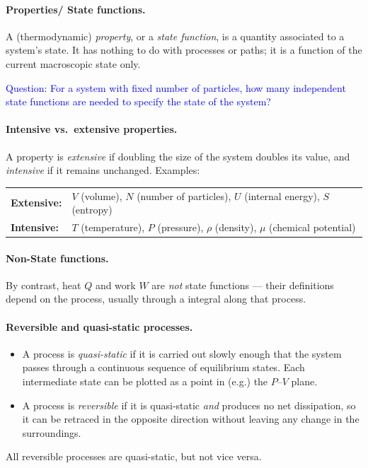 \paragraph{Properties/ State functions.}
A (thermodynamic) \emph{property}, or a \emph{state function}, is a quantity associated to a system's state. It 
has nothing to do with processes or paths; it is a function of the current macroscopic state only.

\textcolor{blue}{Question: For a system with fixed number of particles, how many independent state functions are needed to specify the state of the system?}

\paragraph{Intensive vs.\ extensive properties.}
A property is \emph{extensive} if doubling the size of the system doubles its value, and \emph{intensive} if it remains unchanged. Examples:
\begin{center}
\begin{tabular}{ll}
    \textbf{Extensive:} & $V$ (volume), $N$ (number of particles), $U$ (internal energy), $S$ (entropy)\\
    \textbf{Intensive:} & $T$ (temperature), $P$ (pressure), $\rho$ (density), $\mu$ (chemical potential)
\end{tabular}
\end{center}

\paragraph{Non-State functions.}
By contrast, heat $Q$ and work $W$ are \emph{not} state functions --- their definitions 
depend on the process, usually through a integral along that process. 

\paragraph{Reversible and quasi-static processes.}
\begin{itemize}
    \item A process is \emph{quasi-static} if it is carried out slowly enough that the system passes through a continuous sequence of equilibrium states. Each intermediate state can be plotted as a point in (e.g.) the $P$--$V$ plane.
    \item A process is \emph{reversible} if it is quasi-static \emph{and} produces no net dissipation, so it can be retraced in the opposite direction without leaving any change in the surroundings.
\end{itemize}
All reversible processes are quasi-static, but not vice versa. 

